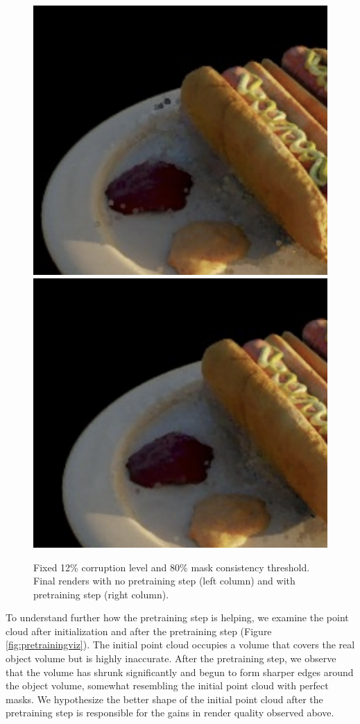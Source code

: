 \documentclass[10pt,twocolumn,letterpaper]{article}
\begin{document}
\begin{figure}[h]
    \includegraphics[width=0.45\linewidth]{figures/npre-3.png}
    \includegraphics[width=0.45\linewidth]{figures/ypre-3.png}
    \caption{ Fixed 12\% corruption level and 80\% mask consistency threshold. Final renders with no pretraining step (left column) and with pretraining step (right column). }
\label{fig:pretrainingqual}
\end{figure}

To understand further how the pretraining step is helping, we examine the point cloud after initialization and after the pretraining step (Figure \ref{fig:pretrainingviz}). The initial point cloud occupies a volume that covers the real object volume but is highly inaccurate. After the pretraining step, we observe that the volume has shrunk significantly and begun to form sharper edges around the object volume, somewhat resembling the initial point cloud with perfect masks. We hypothesize the better shape of the initial point cloud after the pretraining step is responsible for the gains in render quality observed above.
\end{document}

